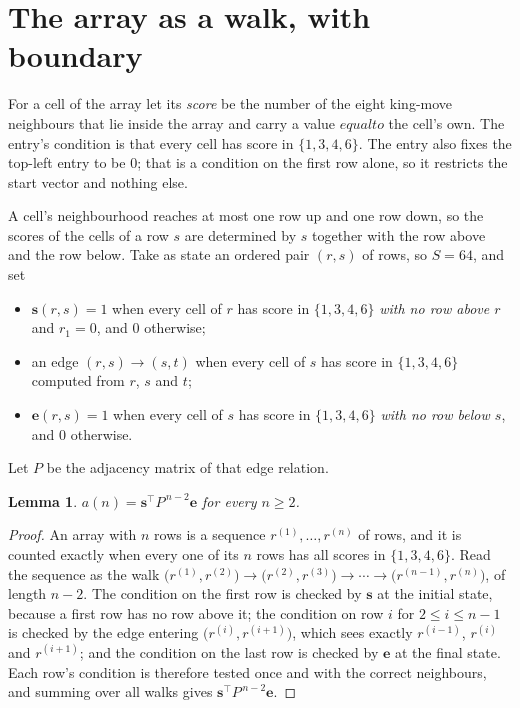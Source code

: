 \documentclass[11pt,a4paper]{article}
\theoremstyle{plain}
\newtheorem{lemma}[theorem]{Lemma}
\theoremstyle{definition}
\begin{document}
\section{The array as a walk, with boundary}

For a cell of the array let its \emph{score} be the number of the eight king-move neighbours that lie inside
the array and carry a value $equal to$ the cell's own. The entry's condition is that every cell
has score in $\{1,3,4,6\}$. The entry also fixes the top-left entry to be $0$; that is a condition on the first row alone, so it restricts the start vector and nothing else.

A cell's neighbourhood reaches at most one row up and one row down, so the scores of the
cells of a row $s$ are determined by $s$ together with the row above and the row below.
Take as state an ordered pair $(r,s)$ of rows, so $S=64$, and set
\begin{itemize}
\item $\mathbf{s}(r,s)=1$ when every cell of $r$ has score in $\{1,3,4,6\}$ \emph{with no row
above $r$} and $r_1=0$, and $0$ otherwise;
\item an edge $(r,s)\to(s,t)$ when every cell of $s$ has score in $\{1,3,4,6\}$ computed from
$r$, $s$ and $t$;
\item $\mathbf{e}(r,s)=1$ when every cell of $s$ has score in $\{1,3,4,6\}$ \emph{with no row
below $s$}, and $0$ otherwise.
\end{itemize}
Let $P$ be the adjacency matrix of that edge relation.

\begin{lemma}\label{lem:walk}
$a(n)=\mathbf{s}^{\!\top}P^{\,n-2}\mathbf{e}$ for every $n\ge2$.
\end{lemma}

\begin{proof}
An array with $n$ rows is a sequence $r^{(1)},\dots,r^{(n)}$ of rows, and it is counted
exactly when every one of its $n$ rows has all scores in $\{1,3,4,6\}$. Read the sequence as the
walk $\bigl(r^{(1)},r^{(2)}\bigr)\to\bigl(r^{(2)},r^{(3)}\bigr)\to\cdots\to
\bigl(r^{(n-1)},r^{(n)}\bigr)$, of length $n-2$. The condition on the first row is
checked by $\mathbf{s}$ at the initial state, because a first row has no row above it; the
condition on row $i$ for $2\le i\le n-1$ is checked by the edge entering
$\bigl(r^{(i)},r^{(i+1)}\bigr)$, which sees exactly $r^{(i-1)}$, $r^{(i)}$ and
$r^{(i+1)}$; and the condition on the last row is checked by $\mathbf{e}$ at the final
state. Each row's condition is therefore tested once and with the correct neighbours, and
summing over all walks gives $\mathbf{s}^{\!\top}P^{\,n-2}\mathbf{e}$.
\end{proof}
\end{document}

